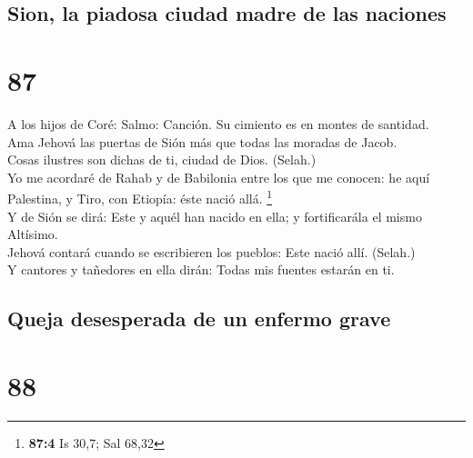 \hypertarget{sion-la-piadosa-ciudad-madre-de-las-naciones}{%
\subsection{Sion, la piadosa ciudad madre de las
naciones}\label{sion-la-piadosa-ciudad-madre-de-las-naciones}}

\hypertarget{section-86}{%
\section{87}\label{section-86}}

 A los hijos de Coré: Salmo: Canción. Su cimiento es en
montes de santidad.\\
 Ama Jehová las puertas de Sión más que todas las moradas
de Jacob.\\
 Cosas ilustres son dichas de ti, ciudad de Dios.
(Selah.)\\
 Yo me acordaré de Rahab y de Babilonia entre los que me
conocen: he aquí Palestina, y Tiro, con Etiopía: éste nació allá.
\footnote{\textbf{87:4} Is 30,7; Sal 68,32}\\
 Y de Sión se dirá: Este y aquél han nacido en ella; y
fortificarála el mismo Altísimo.\\
 Jehová contará cuando se escribieren los pueblos: Este
nació allí. (Selah.)\\
 Y cantores y tañedores en ella dirán: Todas mis fuentes
estarán en ti.

\hypertarget{queja-desesperada-de-un-enfermo-grave}{%
\subsection{Queja desesperada de un enfermo
grave}\label{queja-desesperada-de-un-enfermo-grave}}

\hypertarget{section-87}{%
\section{88}\label{section-87}}


